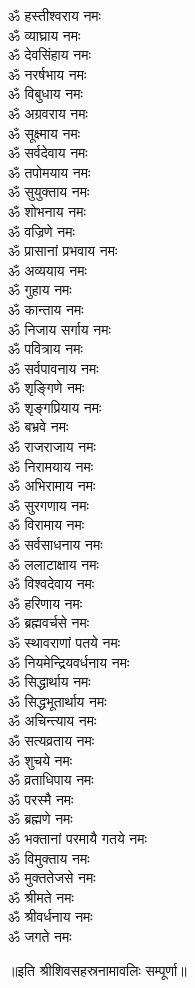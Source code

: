 \begin{multicols}{2}
\begin{flushleft}
ॐ हस्तीश्वराय नमः\\
ॐ व्याघ्राय नमः\\
ॐ देवसिंहाय नमः\\
ॐ नरर्षभाय नमः\\
ॐ विबुधाय नमः\\
ॐ अग्रवराय नमः\\
ॐ सूक्ष्माय नमः\\
ॐ सर्वदेवाय नमः\\
ॐ तपोमयाय नमः\\
ॐ सुयुक्ताय नमः\hfill{}\\
ॐ शोभनाय नमः\\
ॐ वज्रिणे नमः\\
ॐ प्रासानां प्रभवाय नमः\\
ॐ अव्ययाय नमः\\
ॐ गुहाय नमः\\
ॐ कान्ताय नमः\\
ॐ निजाय सर्गाय नमः\\
ॐ पवित्राय नमः\\
ॐ सर्वपावनाय नमः\\
ॐ शृङ्गिणे नमः\hfill{}\\
ॐ शृङ्गप्रियाय नमः\\
ॐ बभ्रवे नमः\\
ॐ राजराजाय नमः\\
ॐ निरामयाय नमः\\
ॐ अभिरामाय नमः\\
ॐ सुरगणाय नमः\\
ॐ विरामाय नमः\\
ॐ सर्वसाधनाय नमः\\
ॐ ललाटाक्षाय नमः\\
ॐ विश्वदेवाय नमः\hfill{}\\
ॐ हरिणाय नमः\\
ॐ ब्रह्मवर्चसे नमः\\
ॐ स्थावराणां पतये नमः\\
ॐ नियमेन्द्रियवर्धनाय नमः\\
ॐ सिद्धार्थाय नमः\\
ॐ सिद्धभूतार्थाय नमः\\
ॐ अचिन्त्याय नमः\\
ॐ सत्यव्रताय नमः\\
ॐ शुचये नमः\\
ॐ व्रताधिपाय नमः\hfill{}\\
ॐ परस्मै नमः\\
ॐ ब्रह्मणे नमः\\
ॐ भक्तानां परमायै गतये नमः\\
ॐ विमुक्ताय नमः\\
ॐ मुक्ततेजसे नमः\\
ॐ श्रीमते नमः\\
ॐ श्रीवर्धनाय नमः\\
ॐ जगते नमः\\
\end{flushleft}
\end{multicols}
\centerline{॥इति श्रीशिवसहस्रनामावलिः सम्पूर्णा॥}
